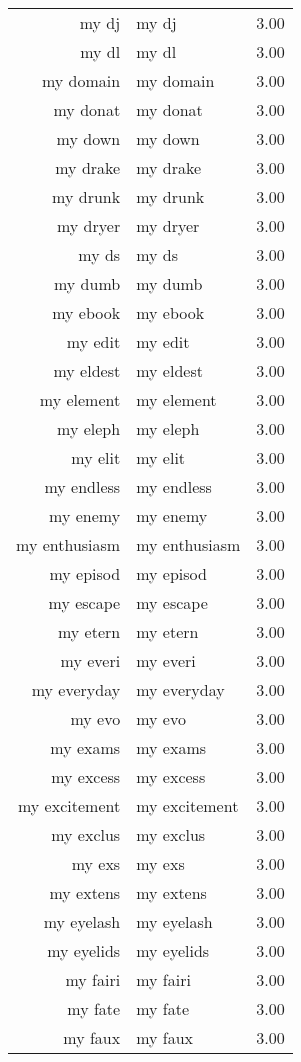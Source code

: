 \begin{table}[ht]
\begin{tabular}{rlr}
  my dj & my dj & 3.00 \\ 
  my dl & my dl & 3.00 \\ 
  my domain & my domain & 3.00 \\ 
  my donat & my donat & 3.00 \\ 
  my down & my down & 3.00 \\ 
  my drake & my drake & 3.00 \\ 
  my drunk & my drunk & 3.00 \\ 
  my dryer & my dryer & 3.00 \\ 
  my ds & my ds & 3.00 \\ 
  my dumb & my dumb & 3.00 \\ 
  my ebook & my ebook & 3.00 \\ 
  my edit & my edit & 3.00 \\ 
  my eldest & my eldest & 3.00 \\ 
  my element & my element & 3.00 \\ 
  my eleph & my eleph & 3.00 \\ 
  my elit & my elit & 3.00 \\ 
  my endless & my endless & 3.00 \\ 
  my enemy & my enemy & 3.00 \\ 
  my enthusiasm & my enthusiasm & 3.00 \\ 
  my episod & my episod & 3.00 \\ 
  my escape & my escape & 3.00 \\ 
  my etern & my etern & 3.00 \\ 
  my everi & my everi & 3.00 \\ 
  my everyday & my everyday & 3.00 \\ 
  my evo & my evo & 3.00 \\ 
  my exams & my exams & 3.00 \\ 
  my excess & my excess & 3.00 \\ 
  my excitement & my excitement & 3.00 \\ 
  my exclus & my exclus & 3.00 \\ 
  my exs & my exs & 3.00 \\ 
  my extens & my extens & 3.00 \\ 
  my eyelash & my eyelash & 3.00 \\ 
  my eyelids & my eyelids & 3.00 \\ 
  my fairi & my fairi & 3.00 \\ 
  my fate & my fate & 3.00 \\ 
  my faux & my faux & 3.00 \\ 

\end{tabular}
\end{table}

